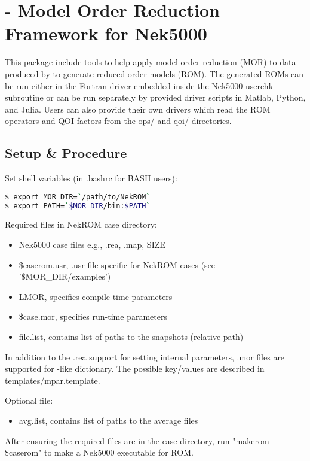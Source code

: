 \section{\href{https://github.com/Nek5000/NekROM}{\color{blue}{NekROM}} - Model Order Reduction Framework for Nek5000}
\noindent This package include tools to help apply model-order reduction (MOR) to data produced by \href{https://github.com/Nek5000/Nek5000}{\color{blue}{Nek5000}} to generate reduced-order models (ROM). The generated ROMs can be run either in the Fortran driver embedded inside the Nek5000 userchk subroutine or can be run separately by provided driver scripts in Matlab, Python, and Julia. Users can also provide their own drivers which read the ROM operators and QOI factors from the ops/ and qoi/ directories.

\subsection{Setup \& Procedure}
Set shell variables (in .bashrc for BASH users):
\begin{lstlisting}[language=bash]
$ export MOR_DIR=`/path/to/NekROM`
$ export PATH=`$MOR_DIR/bin:$PATH`
\end{lstlisting}

Required files in NekROM case directory:
\begin{itemize}
\item Nek5000 case files e.g., .rea, .map, SIZE
\item \$caserom.usr, .usr file specific for NekROM cases (see '\$MOR\_DIR/examples')
\item LMOR,      specifies compile-time parameters
\item \$case.mor, specifies run-time parameters
\item file.list, contains list of paths to the snapshots (relative path)
\end{itemize}
In addition to the .rea support for setting internal parameters, .mor files are
supported for
\href{https://nek5000.github.io/NekDoc/problem_setup/case_files}{\color{blue}{par}}-like
dictionary. The possible key/values are described in templates/mpar.template.

Optional file:
\begin{itemize}
\item avg.list, contains list of paths to the average files
\end{itemize}
After ensuring the required files are in the case directory, run "makerom \$caserom" to make a Nek5000 executable for ROM.

